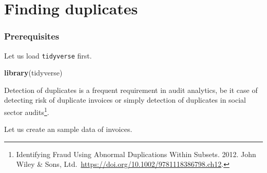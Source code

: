\documentclass[
]{book}
\newenvironment{Shaded}{\begin{snugshade}}{\end{snugshade}}
\newcommand{\AttributeTok}[1]{\textcolor[rgb]{0.13,0.29,0.53}{#1}}
\newcommand{\CommentTok}[1]{\textcolor[rgb]{0.56,0.35,0.01}{\textit{#1}}}
\newcommand{\ConstantTok}[1]{\textcolor[rgb]{0.56,0.35,0.01}{#1}}
\newcommand{\DecValTok}[1]{\textcolor[rgb]{0.00,0.00,0.81}{#1}}
\newcommand{\FunctionTok}[1]{\textcolor[rgb]{0.13,0.29,0.53}{\textbf{#1}}}
\newcommand{\NormalTok}[1]{#1}
\newcommand{\OtherTok}[1]{\textcolor[rgb]{0.56,0.35,0.01}{#1}}
\newcommand{\SpecialCharTok}[1]{\textcolor[rgb]{0.81,0.36,0.00}{\textbf{#1}}}
\newcommand{\StringTok}[1]{\textcolor[rgb]{0.31,0.60,0.02}{#1}}
\begin{document}
\hypertarget{finding-duplicates}{%
\chapter{Finding duplicates}\label{finding-duplicates}}

\hypertarget{prerequisites-4}{%
\subsection*{Prerequisites}\label{prerequisites-4}}

Let us load \texttt{tidyverse} first.

\begin{Shaded}
\begin{Highlighting}[]
\FunctionTok{library}\NormalTok{(tidyverse)}
\end{Highlighting}
\end{Shaded}

Detection of duplicates is a frequent requirement in audit analytics, be it case of detecting risk of duplicate invoices or simply detection of duplicates in social sector audits\footnote{Identifying Fraud Using Abnormal Duplications Within Subsets. 2012. John Wiley \& Sons, Ltd.~\url{https://doi.org/10.1002/9781118386798.ch12}.}.

Let us create an sample data of invoices.

\begin{Shaded}
\end{Shaded}
\end{document}
